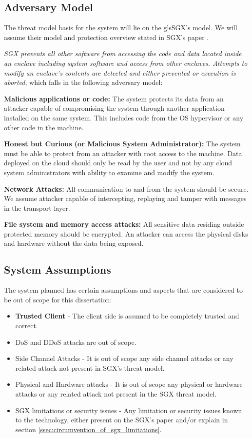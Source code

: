 \subsection{Adversary Model}
\label{ssec:adversary_model}

The threat model basis for the system will lie on the gls{SGX}'s model. We will assume their model and protection overview stated in \gls{SGX}'s paper \cite{sgx:7}.

\textit{SGX prevents all other software from accessing the code and data located inside an enclave including system software and access from other enclaves. Attempts to modify an enclave’s contents are detected and either prevented or execution is aborted}, \cite{sgx:7} which falls in the following adversary model:

\textbf{Malicious applications or code:} The system protects its data from an attacker capable of compromising the system through another application installed on the same system. This includes code from the \gls{OS} hypervisor or any other code in the machine.

\textbf{Honest but Curious (or Malicious System Administrator):} The system must be able to protect from an attacker with root access to the machine. Data deployed on the cloud should only be read by the user and not by any cloud system administrators with ability to examine and modify the system.

\textbf{Network Attacks:} All communication to and from the system should be secure. We assume attacker capable of intercepting, replaying and tamper with messages in the transport layer. 

\textbf{File system and memory access attacks:} All sensitive data residing outside protected memory should be encrypted. An attacker can access the physical disks and hardware without the data being exposed.

\subsection{System Assumptions}
\label{ssec:system_assumptions}

The system planned has certain assumptions and aspects that are considered to be out of scope for this dissertation:

\begin{itemize}
	\item \textbf{Trusted Client} - The client side is assumed to be completely trusted and correct.
	\item \gls{DoS} and \gls{DDoS} attacks are out of scope.
	\item Side Channel Attacks - It is out of scope any side channel attacks or any related attack not present in \gls{SGX}'s threat model.
	\item Physical and Hardware attacks - It is out of scope any physical or hardware attacks or any related attack not present in the \gls{SGX} threat model.
	\item \gls{SGX} limitations or security issues - Any limitation or security issues known to the technology, either present on the \gls{SGX}'s paper and/or explain in section \ref{ssec:circumvention_of_sgx_limitations}.
\end{itemize}

